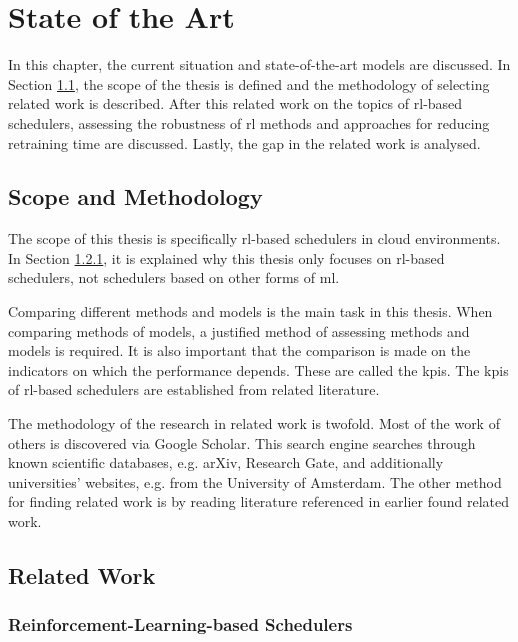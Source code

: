 \chapter{State of the Art}\label{sec:state-of-the-art}

In this chapter, the current situation and state-of-the-art models are
discussed. In Section \ref{sec:scope}, the scope of the thesis is defined and
the methodology of selecting related work is described. After this related
work on the topics of \gls{rl}-based schedulers, assessing the robustness of
\gls{rl} methods and approaches for reducing retraining time are discussed.
Lastly, the gap in the related work is analysed.


\section{Scope and Methodology}\label{sec:scope}

The scope of this thesis is specifically \gls{rl}-based schedulers in cloud
environments. In Section \ref{sec:rl}, it is explained why this thesis only
focuses on \gls{rl}-based schedulers, not schedulers based on other forms of
\gls{ml}.

Comparing different methods and models is the main task in this thesis. When
comparing methods of models, a justified method of assessing methods and models
is required. It is also important that the comparison is made on the
indicators on which the performance depends. These are called the \glspl{kpi}. The
\glspl{kpi} of \gls{rl}-based schedulers are established from related literature.

The methodology of the research in related work is twofold. Most of the work
of others is discovered via Google Scholar. This
search engine searches through known scientific databases, e.g.
arXiv, Research Gate, and
additionally universities' websites, e.g. from the University of
Amsterdam. The other method for finding related work is by
reading literature referenced in earlier found related work.


\section{Related Work}

\subsection{Reinforcement-Learning-based Schedulers}\label{sec:rl}


